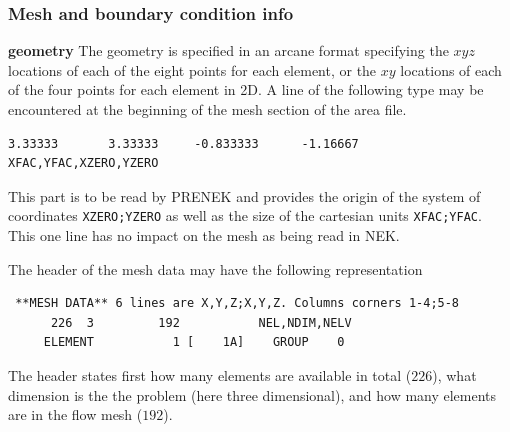 \subsubsection*{Mesh and boundary condition info} 
\begin{description}
\item{\bf geometry} The geometry is specified in an arcane format specifying
    the $xyz$ locations of each of the eight points for each element,
    or the $xy$ locations of each of the four points for each element in 2D.
A line of the following type may be encountered at the beginning of the mesh section of the area file.    
\begin{verbatim}
3.33333       3.33333     -0.833333      -1.16667     XFAC,YFAC,XZERO,YZERO
\end{verbatim}
This part is to be read by PRENEK and provides the origin of the system of coordinates \texttt{XZERO;YZERO} as well as the size of the cartesian units \texttt{XFAC;YFAC}. This one line has no impact on the mesh as being read in NEK. 

The header of the mesh data may have the following representation
\begin{center}
\begin{verbatim} **MESH DATA** 6 lines are X,Y,Z;X,Y,Z. Columns corners 1-4;5-8
      226  3         192           NEL,NDIM,NELV
     ELEMENT           1 [    1A]    GROUP    0
     \end{verbatim}
     \end{center}
The header states first how many elements are available in total ($226$), what dimension is the the problem (here three dimensional), and how many elements are in the flow mesh ($192$). 



\end{description}
